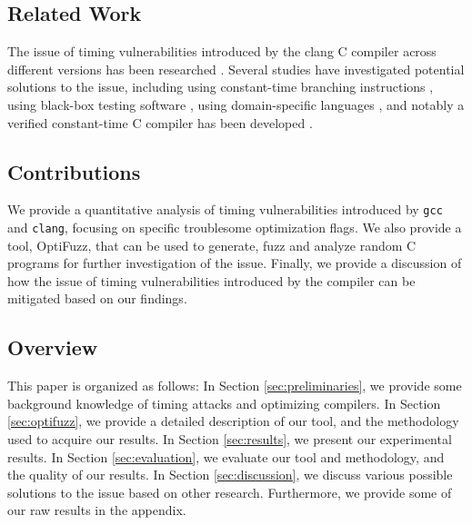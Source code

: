 \subsection{Related Work}
The issue of timing vulnerabilities introduced by the clang C compiler across different versions has been researched \citep{what-you-c}. 
Several studies have investigated potential solutions to the issue, including using constant-time branching instructions \citep{what-you-c}, using black-box testing software \citep{dudect}, using domain-specific languages \citep{fact}, and notably a verified constant-time C compiler has been developed \citep{verified-constant-time-c-comiler}.

\subsection{Contributions}
We provide a quantitative analysis of timing vulnerabilities introduced by \texttt{gcc} and \texttt{clang}, focusing on specific troublesome optimization flags.
We also provide a tool, OptiFuzz, that can be used to generate, fuzz and analyze random C programs for further investigation of the issue.
Finally, we provide a discussion of how the issue of timing vulnerabilities introduced by the compiler can be mitigated based on our findings.

\subsection{Overview}
This paper is organized as follows: 
In Section \ref{sec:preliminaries}, we provide some background knowledge of timing attacks and optimizing compilers.
In Section \ref{sec:optifuzz}, we provide a detailed description of our tool, and the methodology used to acquire our results.
In Section \ref{sec:results}, we present our experimental results.
In Section \ref{sec:evaluation}, we evaluate our tool and methodology, and the quality of our results.
In Section \ref{sec:discussion}, we discuss various possible solutions to the issue based on other research.
Furthermore, we provide some of our raw results in the appendix.